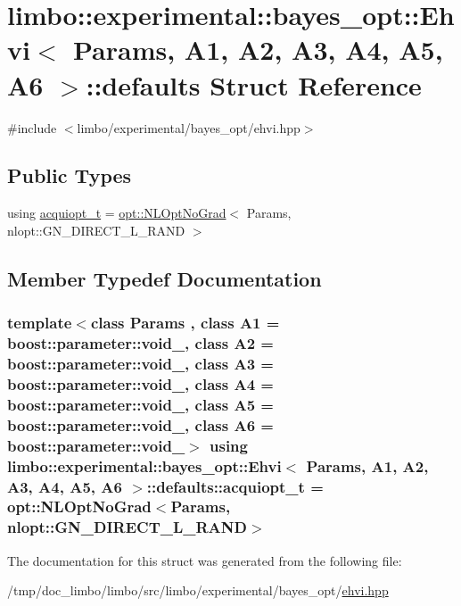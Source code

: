 \hypertarget{structlimbo_1_1experimental_1_1bayes__opt_1_1_ehvi_1_1defaults}{}\section{limbo\+:\+:experimental\+:\+:bayes\+\_\+opt\+:\+:Ehvi$<$ Params, A1, A2, A3, A4, A5, A6 $>$\+:\+:defaults Struct Reference}
\label{structlimbo_1_1experimental_1_1bayes__opt_1_1_ehvi_1_1defaults}


{\ttfamily \#include $<$limbo/experimental/bayes\+\_\+opt/ehvi.\+hpp$>$}

\subsection*{Public Types}
\begin{DoxyCompactItemize}
\item 
using \hyperlink{structlimbo_1_1experimental_1_1bayes__opt_1_1_ehvi_1_1defaults_aa57e9da768ea83c6b467b8e9f31da835}{acquiopt\+\_\+t} = \hyperlink{structlimbo_1_1opt_1_1_n_l_opt_no_grad}{opt\+::\+N\+L\+Opt\+No\+Grad}$<$ Params, nlopt\+::\+G\+N\+\_\+\+D\+I\+R\+E\+C\+T\+\_\+\+L\+\_\+\+R\+A\+ND $>$
\end{DoxyCompactItemize}


\subsection{Member Typedef Documentation}
\subsubsection[{\texorpdfstring{acquiopt\+\_\+t}{acquiopt_t}}]{\setlength{\rightskip}{0pt plus 5cm}template$<$class Params , class A1  = boost\+::parameter\+::void\+\_\+, class A2  = boost\+::parameter\+::void\+\_\+, class A3  = boost\+::parameter\+::void\+\_\+, class A4  = boost\+::parameter\+::void\+\_\+, class A5  = boost\+::parameter\+::void\+\_\+, class A6  = boost\+::parameter\+::void\+\_\+$>$ using {\bf limbo\+::experimental\+::bayes\+\_\+opt\+::\+Ehvi}$<$ Params, A1, A2, A3, A4, A5, A6 $>$\+::{\bf defaults\+::acquiopt\+\_\+t} =  {\bf opt\+::\+N\+L\+Opt\+No\+Grad}$<$Params, nlopt\+::\+G\+N\+\_\+\+D\+I\+R\+E\+C\+T\+\_\+\+L\+\_\+\+R\+A\+ND$>$}\hypertarget{structlimbo_1_1experimental_1_1bayes__opt_1_1_ehvi_1_1defaults_aa57e9da768ea83c6b467b8e9f31da835}{}\label{structlimbo_1_1experimental_1_1bayes__opt_1_1_ehvi_1_1defaults_aa57e9da768ea83c6b467b8e9f31da835}


The documentation for this struct was generated from the following file\+:\begin{DoxyCompactItemize}
\item 
/tmp/doc\+\_\+limbo/limbo/src/limbo/experimental/bayes\+\_\+opt/\hyperlink{bayes__opt_2ehvi_8hpp}{ehvi.\+hpp}\end{DoxyCompactItemize}
